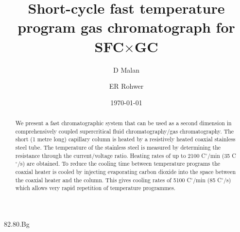 \documentclass[aip,rsi,preprint,graphicx]{revtex4-1} %
\begin{document}

\title{Short-cycle fast temperature program gas chromatograph for SFC$\times$GC} %



\author{D Malan}

\author{ER Rohwer}



\date{\today}

\begin{abstract}
We present a fast chromatographic system that can be used as a second dimension in comprehensively coupled supercritical fluid chromatography/gas chromatography. The short (1 metre long) capillary column is heated by a resistively heated coaxial stainless steel tube. The temperature of the stainless steel is measured by determining the resistance through the current/voltage ratio. Heating rates of up to 2100 C$^\circ$/min (35 C$^\circ$/s) are obtained. To reduce the cooling time between temperature programs the coaxial heater is cooled by injecting evaporating carbon dioxide into the space between the coaxial heater and the column. This gives cooling rates of 5100 C$^\circ$/min (85 C$^\circ$/s) which allows very rapid repetition of temperature programmes.
\end{abstract}

\pacs{}%
{82.80.Bg}
\end{document}
